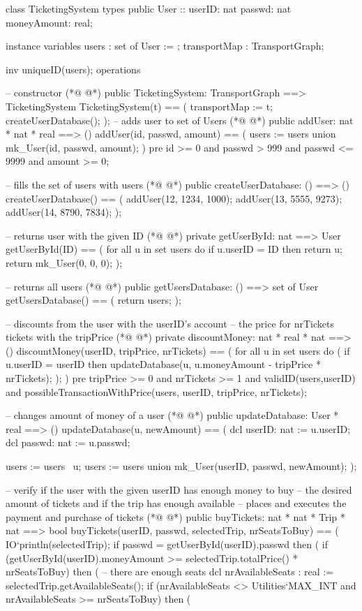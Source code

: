 \begin{vdmpp}[breaklines=true]
class TicketingSystem
types
 public User :: userID: nat
          passwd: nat
         moneyAmount: real;

instance variables
 users : set of User := {};
 transportMap : TransportGraph;
 
  inv uniqueID(users); 
operations

 -- constructor
(*@
\label{TicketingSystem:15}
@*)
 public TicketingSystem: TransportGraph ==> TicketingSystem
 TicketingSystem(t) ==
 (
  transportMap := t;
  createUserDatabase();
 );
 -- adds user to set of Users
(*@
\label{addUser:22}
@*)
 public addUser: nat * nat * real ==> ()
 addUser(id, passwd, amount) ==
 (
  users := users union {mk_User(id, passwd, amount)};
 )
 pre id >= 0 and passwd > 999 and passwd <= 9999 and amount >= 0;
 
 -- fills the set of users with users
(*@
\label{createUserDatabase:30}
@*)
 public createUserDatabase: () ==> ()
 createUserDatabase() ==
 (
  addUser(12, 1234, 1000);
  addUser(13, 5555, 9273);
  addUser(14, 8790, 7834);
 );
 
 -- returns user with the given ID
(*@
\label{getUserById:39}
@*)
 private getUserById: nat ==> User
 getUserById(ID) ==
 (
  for all u in set users do
   if u.userID = ID then return u;
  return mk_User(0, 0, 0);
 );
 
 -- returns all users
(*@
\label{getUsersDatabase:48}
@*)
 public getUsersDatabase: () ==> set of User 
 getUsersDatabase() ==
 (
  return users;
 );
 
 -- discounts from the user with the userID's account
 -- the price for nrTickets tickets with the tripPrice
(*@
\label{discountMoney:56}
@*)
 private discountMoney: nat * real * nat ==> ()
 discountMoney(userID, tripPrice, nrTickets) ==
 (
  for all u in set users do (
   if u.userID = userID then
    updateDatabase(u, u.moneyAmount - tripPrice * nrTickets);
  );
 )
 pre tripPrice >= 0 and nrTickets >= 1 and validID(users,userID) and possibleTransactionWithPrice(users, userID, tripPrice, nrTickets);
 
 -- changes amount of money of a user
(*@
\label{updateDatabase:67}
@*)
 public updateDatabase: User * real ==> ()
 updateDatabase(u, newAmount) ==
 (
  dcl userID: nat := u.userID;
  dcl passwd: nat := u.passwd;
  
  users := users \ {u};
  users := users union {mk_User(userID, passwd, newAmount)};
 );
 
 -- verify if the user with the given userID has enough money to buy
 -- the desired amount of tickets and if the trip has enough available
 -- places and executes the payment and purchase of tickets 
(*@
\label{buyTickets:80}
@*)
 public buyTickets: nat * nat * Trip * nat ==> bool
 buyTickets(userID, passwd, selectedTrip, nrSeatsToBuy) ==
 (
  IO`println(selectedTrip);
  if passwd = getUserById(userID).passwd then (
   if (getUserById(userID).moneyAmount >= selectedTrip.totalPrice() * nrSeatsToBuy) then (
    -- there are enough seats
    dcl nrAvailableSeats : real := selectedTrip.getAvailableSeats();
    if (nrAvailableSeats <> Utilities`MAX_INT and nrAvailableSeats >= nrSeatsToBuy) then (
    

\end{vdmpp}

